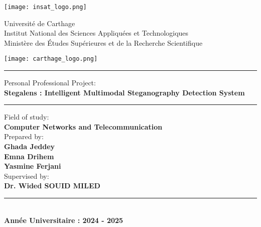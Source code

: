 \documentclass[12pt]{article}
\begin{document}
\thispagestyle{empty}


\begin{minipage}{0.2\textwidth}
    \texttt{[image: insat\_logo.png]}
\end{minipage}
\begin{minipage}{0.5\textwidth}
    \centering
    Université de Carthage\\
    Institut National des Sciences Appliquées et Technologiques\\
    Ministère des Études Supérieures et de la Recherche Scientifique
\end{minipage}
\begin{minipage}{0.2\textwidth}
    \flushright
    \texttt{[image: carthage\_logo.png]}
\end{minipage}

\vspace{0.5cm}
\begin{center}
\rule{\textwidth}{0.4pt}
\end{center}
\vspace{0.5cm}

\begin{center}
    {\Large Personal Professional Project:}\\[1em]
    \textbf{\Huge Stegalens : Intelligent Multimodal Steganography Detection System}\\[1em]
\end{center}

\vspace{0.5cm}
\begin{center}
\rule{0.8\textwidth}{0.3pt}
\end{center}
\vspace{0.5cm}

\begin{center}
    \Large{Field of study:}\\[0.5cm]
    \Large\textbf{Computer Networks and Telecommunication}\\[1cm]

    \Large{Prepared by:}\\[0.5cm]
    \textbf{\Large Ghada Jeddey}\\
    \textbf{\Large Emna Drihem}\\
    \textbf{\Large Yasmine Ferjani}\\[1cm]

    \Large{Supervised by:}\\[0.5cm]
    \Large\textbf{Dr. Wided SOUID MILED}\\[0.5cm]

    \rule{0.8\textwidth}{0.3pt}\\[1cm]

    \textbf{Année Universitaire : 2024 - 2025}
\end{center}
\end{document}
